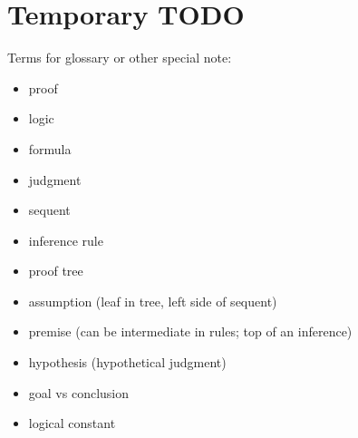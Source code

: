 \documentclass[conference]{IEEEtran}
\begin{document}
\section{Temporary TODO}

Terms for glossary or other special note:

\begin{itemize}
    \item proof
    \item logic
    \item formula
    \item judgment
    \item sequent
    \item inference rule
    \item proof tree
    \item assumption (leaf in tree, left side of sequent)
    \item premise (can be intermediate in rules; top of an inference)
    \item hypothesis (hypothetical judgment)
    \item goal vs conclusion
    \item logical constant
\end{itemize}



\end{document}
